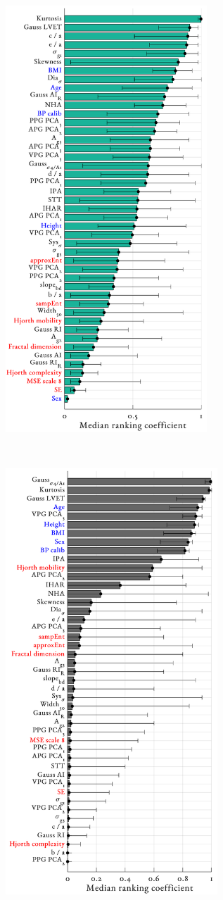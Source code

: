 \documentclass[fleqn,10pt]{wlscirep}
\begin{document}
\begin{figure}[h]
	\centering
	\begin{subfigure}{.49\textwidth}
		\centering
		\includegraphics[height = 16cm]{feature_results_RF.png}
		\caption{}
	\end{subfigure}
	~
	\begin{subfigure}{.49\textwidth}
		\centering
		\includegraphics[height = 16cm]{feature_results_LR.png}

\end{subfigure}
\end{figure}
\end{document}
